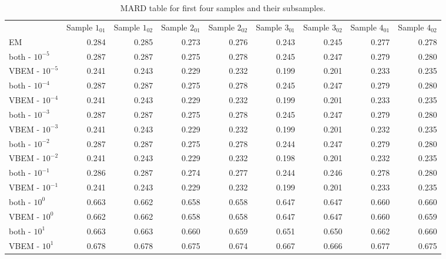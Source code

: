   \begin{table}[t]
    \caption{MARD table for first four samples and their subsamples.}
    \label{mardtable}
    \tabcolsep=0pt%
    \begin{tabular*}{\textwidth}{@{\extracolsep{\fill}}lrrrrrrrr@{\extracolsep{\fill}}}
    \toprule%
    \textbf{} &
    \multicolumn{1}{l}{Sample $1_{01}$} &
    \multicolumn{1}{l}{Sample $1_{02}$} &
    \multicolumn{1}{l}{Sample $2_{01}$} &
    \multicolumn{1}{l}{Sample $2_{02}$} &
    \multicolumn{1}{l}{Sample $3_{01}$} &
    \multicolumn{1}{l}{Sample $3_{02}$} &
    \multicolumn{1}{l}{Sample $4_{01}$} &
    \multicolumn{1}{l}{Sample $4_{02}$} \\
  EM           & 0.284 & 0.285 & 0.273 & 0.276 & 0.243 & 0.245 & 0.277 & 0.278 \\
  both - $10^{-5}$ & 0.287 & 0.287 & 0.275 & 0.278 & 0.245 & 0.247 & 0.279 & 0.280 \\
  VBEM - $10^{-5}$ & 0.241 & 0.243 & 0.229 & 0.232 & 0.199 & 0.201 & 0.233 & 0.235 \\
  both - $10^{-4}$ & 0.287 & 0.287 & 0.275 & 0.278 & 0.245 & 0.247 & 0.279 & 0.280 \\
  VBEM - $10^{-4}$ & 0.241 & 0.243 & 0.229 & 0.232 & 0.199 & 0.201 & 0.233 & 0.235 \\
  both - $10^{-3}$ & 0.287 & 0.287 & 0.275 & 0.278 & 0.245 & 0.247 & 0.279 & 0.280 \\
  VBEM - $10^{-3}$ & 0.241 & 0.243 & 0.229 & 0.232 & 0.199 & 0.201 & 0.232 & 0.235 \\
  both - $10^{-2}$ & 0.287 & 0.287 & 0.275 & 0.278 & 0.244 & 0.247 & 0.279 & 0.280 \\
  VBEM - $10^{-2}$ & 0.241 & 0.243 & 0.229 & 0.232 & 0.198 & 0.201 & 0.232 & 0.235 \\
  both - $10^{-1}$ & 0.286 & 0.287 & 0.274 & 0.277 & 0.244 & 0.246 & 0.278 & 0.280 \\
  VBEM - $10^{-1}$ & 0.241 & 0.243 & 0.229 & 0.232 & 0.199 & 0.201 & 0.233 & 0.235 \\
  both - $10^0$  & 0.663 & 0.662 & 0.658 & 0.658 & 0.647 & 0.647 & 0.660 & 0.660 \\
  VBEM - $10^0$  & 0.662 & 0.662 & 0.658 & 0.658 & 0.647 & 0.647 & 0.660 & 0.659 \\
  both - $10^1$  & 0.663 & 0.663 & 0.660 & 0.659 & 0.651 & 0.650 & 0.662 & 0.660 \\
  VBEM - $10^1$  & 0.678 & 0.678 & 0.675 & 0.674 & 0.667 & 0.666 & 0.677 & 0.675 \\


\end{tabular*}
\end{table}

